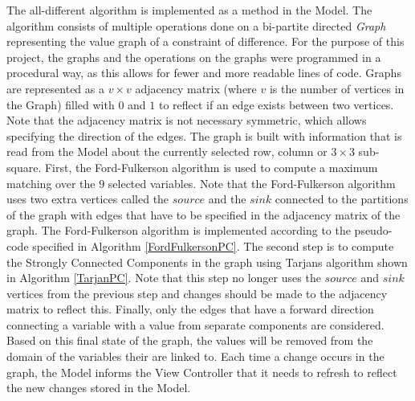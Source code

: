 \documentclass{l4proj}
\begin{document}
\noindent The all-different algorithm is implemented as a method in the Model. The algorithm consists of multiple operations done on a bi-partite directed \textit{Graph} representing the value graph of a constraint of difference. For the purpose of this project, the graphs and the operations on the graphs were programmed in a procedural way, as this allows for fewer and more readable lines of code. Graphs are represented as a $v \times v$ adjacency matrix (where $v$ is the number of vertices in the Graph) filled with $0$ and $1$ to reflect if an edge exists between two vertices. Note that the adjacency matrix is not necessary symmetric, which allows specifying the direction of the edges. The graph is built with information that is read from the Model about the currently selected row, column or $3 \times 3$ sub-square. First, the Ford-Fulkerson algorithm  \cite{ford1956maximal} is used to compute a maximum matching over the $9$ selected variables. Note that the Ford-Fulkerson algorithm uses two extra vertices called the $source$ and the $sink$ connected to the partitions of the graph with edges that have to be specified in the adjacency matrix of the graph. The Ford-Fulkerson algorithm is implemented according to the pseudo-code specified in Algorithm \ref{FordFulkersonPC}. The second step is to compute the Strongly Connected Components in the graph using Tarjan\textquotesingle s algorithm \cite{tarjan1972depth} shown in Algorithm \ref{TarjanPC}. Note that this step no longer uses the $source$ and $sink$ vertices from the previous step and changes should be made to the  adjacency matrix to reflect this. Finally, only the edges that have a forward direction connecting a variable with a value from separate components are considered. Based on this final state of the graph, the values will be removed from the domain of the variables their are linked to. Each time a change occurs in the graph, the Model informs the View Controller that it needs to refresh to reflect the new changes stored in the Model.
\end{document}
